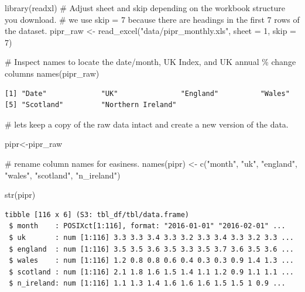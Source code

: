 \documentclass[
  letterpaper,
  DIV=11,
  numbers=noendperiod]{scrreprt}
\newenvironment{Shaded}{\begin{snugshade}}{\end{snugshade}}
\newcommand{\AttributeTok}[1]{\textcolor[rgb]{0.40,0.45,0.13}{#1}}
\newcommand{\CommentTok}[1]{\textcolor[rgb]{0.37,0.37,0.37}{#1}}
\newcommand{\DecValTok}[1]{\textcolor[rgb]{0.68,0.00,0.00}{#1}}
\newcommand{\FunctionTok}[1]{\textcolor[rgb]{0.28,0.35,0.67}{#1}}
\newcommand{\NormalTok}[1]{\textcolor[rgb]{0.00,0.23,0.31}{#1}}
\newcommand{\OtherTok}[1]{\textcolor[rgb]{0.00,0.23,0.31}{#1}}
\newcommand{\StringTok}[1]{\textcolor[rgb]{0.13,0.47,0.30}{#1}}
\begin{document}
\begin{Shaded}
\begin{Highlighting}[]
\FunctionTok{library}\NormalTok{(readxl)}
\CommentTok{\# Adjust \textquotesingle{}sheet\textquotesingle{} and \textquotesingle{}skip\textquotesingle{} depending on the workbook structure you download.}
\CommentTok{\# we use skip = 7 because there are headings in the first 7 rows of the dataset.}
\NormalTok{pipr\_raw }\OtherTok{\textless{}{-}} \FunctionTok{read\_excel}\NormalTok{(}\StringTok{"data/pipr\_monthly.xls"}\NormalTok{, }\AttributeTok{sheet =} \DecValTok{1}\NormalTok{, }\AttributeTok{skip =} \DecValTok{7}\NormalTok{)}

\CommentTok{\# Inspect names to locate the date/month, UK Index, and UK annual \% change columns}
\FunctionTok{names}\NormalTok{(pipr\_raw)}
\end{Highlighting}
\end{Shaded}

\begin{verbatim}
[1] "Date"             "UK"               "England"          "Wales"           
[5] "Scotland"         "Northern Ireland"
\end{verbatim}

\begin{Shaded}
\begin{Highlighting}[]
\CommentTok{\# let\textquotesingle{}s keep a copy of the raw data intact and create a new version of the data.}

\NormalTok{pipr}\OtherTok{\textless{}{-}}\NormalTok{pipr\_raw}

\CommentTok{\# rename column names for easiness. }
\FunctionTok{names}\NormalTok{(pipr) }\OtherTok{\textless{}{-}} \FunctionTok{c}\NormalTok{(}\StringTok{"month"}\NormalTok{, }\StringTok{"uk"}\NormalTok{, }\StringTok{"england"}\NormalTok{, }\StringTok{"wales"}\NormalTok{, }\StringTok{"scotland"}\NormalTok{, }\StringTok{"n\_ireland"}\NormalTok{)}

\FunctionTok{str}\NormalTok{(pipr)}
\end{Highlighting}
\end{Shaded}

\begin{verbatim}
tibble [116 x 6] (S3: tbl_df/tbl/data.frame)
 $ month    : POSIXct[1:116], format: "2016-01-01" "2016-02-01" ...
 $ uk       : num [1:116] 3.3 3.3 3.4 3.3 3.2 3.3 3.4 3.3 3.2 3.3 ...
 $ england  : num [1:116] 3.5 3.5 3.6 3.5 3.3 3.5 3.7 3.6 3.5 3.6 ...
 $ wales    : num [1:116] 1.2 0.8 0.8 0.6 0.4 0.3 0.3 0.9 1.4 1.3 ...
 $ scotland : num [1:116] 2.1 1.8 1.6 1.5 1.4 1.1 1.2 0.9 1.1 1.1 ...
 $ n_ireland: num [1:116] 1.1 1.3 1.4 1.6 1.6 1.6 1.5 1.5 1 0.9 ...
\end{verbatim}
\end{document}
